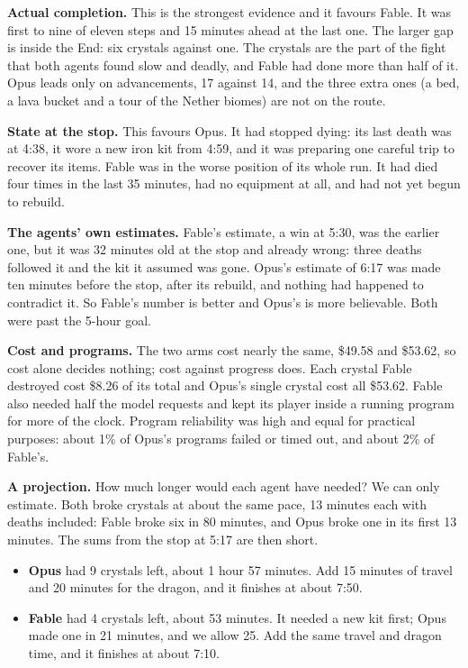 \documentclass[11pt,a4paper]{article}
\begin{document}
\textbf{Actual completion.} This is the strongest evidence and it favours Fable. It was first to nine of eleven steps and 15 minutes ahead at the last one. The larger gap is inside the End: six crystals against one. The crystals are the part of the fight that both agents found slow and deadly, and Fable had done more than half of it. Opus leads only on advancements, 17 against 14, and the three extra ones (a bed, a lava bucket and a tour of the Nether biomes) are not on the route.

\textbf{State at the stop.} This favours Opus. It had stopped dying: its last death was at 4:38, it wore a new iron kit from 4:59, and it was preparing one careful trip to recover its items. Fable was in the worse position of its whole run. It had died four times in the last 35 minutes, had no equipment at all, and had not yet begun to rebuild.

\textbf{The agents' own estimates.} Fable's estimate, a win at 5:30, was the earlier one, but it was 32 minutes old at the stop and already wrong: three deaths followed it and the kit it assumed was gone. Opus's estimate of 6:17 was made ten minutes before the stop, after its rebuild, and nothing had happened to contradict it. So Fable's number is better and Opus's is more believable. Both were past the 5-hour goal.

\textbf{Cost and programs.} The two arms cost nearly the same, \$49.58 and \$53.62, so cost alone decides nothing; cost against progress does. Each crystal Fable destroyed cost \$8.26 of its total and Opus's single crystal cost all \$53.62. Fable also needed half the model requests and kept its player inside a running program for more of the clock. Program reliability was high and equal for practical purposes: about 1\% of Opus's programs failed or timed out, and about 2\% of Fable's.

\textbf{A projection.} How much longer would each agent have needed? We can only estimate. Both broke crystals at about the same pace, 13 minutes each with deaths included: Fable broke six in 80 minutes, and Opus broke one in its first 13 minutes. The sums from the stop at 5:17 are then short.

\begin{itemize}
\item \textbf{Opus} had 9 crystals left, about 1 hour 57 minutes. Add 15 minutes of travel and 20 minutes for the dragon, and it finishes at about 7:50.
\item \textbf{Fable} had 4 crystals left, about 53 minutes. It needed a new kit first; Opus made one in 21 minutes, and we allow 25. Add the same travel and dragon time, and it finishes at about 7:10.
\end{itemize}
\end{document}
